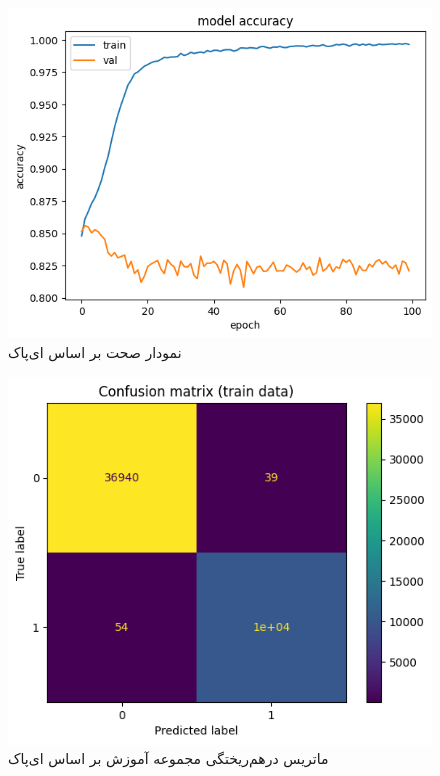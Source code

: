 \documentclass{article}
\begin{document}
\begin{figure}[!h]
    \centering\includegraphics[scale=.55]{./p6-2}
    \caption{نمودار صحت بر اساس ای‌پاک}\label{fig.62}
\end{figure}
\cleardoublepage

\begin{figure}[!h]
    \centering\includegraphics[scale=.55]{./p6-3}
    \caption{ماتریس درهم‌ریختگی مجموعه آموزش بر اساس ای‌پاک}\label{fig.63}
\end{figure}
\end{document}
